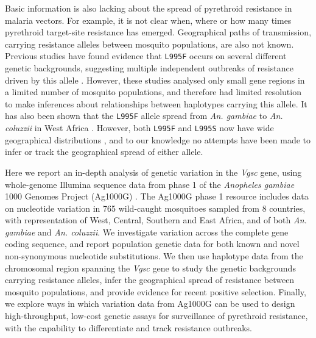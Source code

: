 \documentclass[a4paper,11pt,abstracton,hidelinks]{scrartcl}
\begin{document}
Basic information is also lacking about the spread of pyrethroid resistance in malaria vectors.
%
For example, it is not clear when, where or how many times pyrethroid target-site resistance has emerged.
%
Geographical paths of transmission, carrying resistance alleles between mosquito populations, are also not known.
%
Previous studies have found evidence that \texttt{L995F} occurs on several different genetic backgrounds, suggesting multiple independent outbreaks of resistance driven by this allele \cite{Pinto2007,Etang2009,Lynd2010,Santolamazza2015}.
%
However, these studies analysed only small gene regions in a limited number of mosquito populations, and therefore had limited resolution to make inferences about relationships between haplotypes carrying this allele.
%
It has also been shown that the \texttt{L995F} allele spread from \textit{An. gambiae} to \textit{An. coluzzii} in West Africa \cite{Clarkson2014,Norris2015}.
%
However, both \texttt{L995F} and \texttt{L995S} now have wide geographical distributions \cite{Silva2014}, and to our knowledge no attempts have been made to infer or track the geographical spread of either allele.

Here we report an in-depth analysis of genetic variation in the \textit{Vgsc} gene, using whole-genome Illumina sequence data from phase 1 of the \emph{Anopheles gambiae} 1000 Genomes Project (Ag1000G) \cite{Ag1000gConsortium2017}.
%
The Ag1000G phase 1 resource includes data on nucleotide variation in 765 wild-caught mosquitoes sampled from 8 countries, with representation of West, Central, Southern and East Africa, and of both \textit{An. gambiae} and \textit{An. coluzzii}.
%
We investigate variation across the complete gene coding sequence, and report population genetic data for both known and novel non-synonymous nucleotide substitutions.
%
We then use haplotype data from the chromosomal region spanning the \textit{Vgsc} gene to study the genetic backgrounds carrying resistance alleles, infer the geographical spread of resistance between mosquito populations, and provide evidence for recent positive selection.
%
Finally, we explore ways in which variation data from Ag1000G can be used to design high-throughput, low-cost genetic assays for surveillance of pyrethroid resistance, with the capability to differentiate and track resistance outbreaks.


\end{document}
